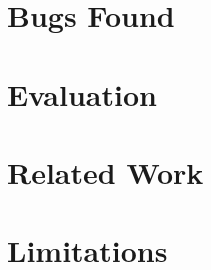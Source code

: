 \documentclass[11pt]{article}
\theoremstyle{definition}
\begin{document}
\section{Bugs Found}

\section{Evaluation}

\section{Related Work}

\section{Limitations}
\end{document}
